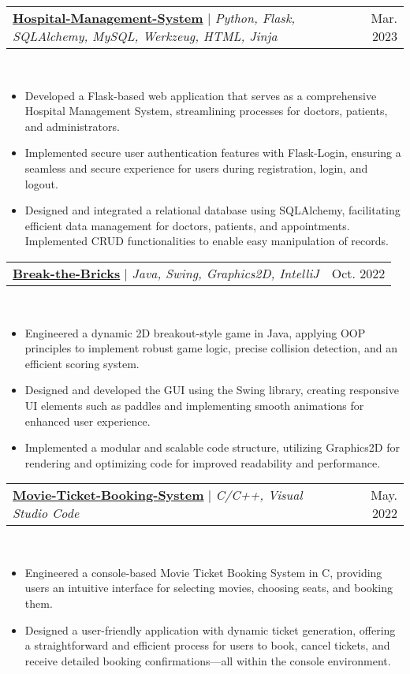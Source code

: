 \documentclass[letterpaper,11pt]{article}
\makeatletter
\newcommand{\resumeItem}[1]{
  \item\small{
    {#1 \vspace{-2pt}}
  }
}
\newcommand{\resumeProjectHeading}[2]{
    \item
    \begin{tabular*}{0.97\textwidth}{l@{\extracolsep{\fill}}r}
      \small#1 & #2 \\
    \end{tabular*}\vspace{-7pt}
}
\newcommand{\resumeItemListStart}{\begin{itemize}}
\newcommand{\resumeItemListEnd}{\end{itemize}\vspace{-5pt}}
\makeatother
\begin{document}
        \resumeProjectHeading
         {\href{https://github.com/Kathankathrotiya/Hospital-Management-System}{\faIcon{external-link-alt} \textbf{ Hospital-Management-System}} $|$ \footnotesize\emph{Python, Flask, SQLAlchemy, MySQL, Werkzeug, HTML, Jinja}}{Mar. 2023} \\
        \resumeItemListStart
            \resumeItem{Developed a Flask-based web application that serves as a comprehensive Hospital Management System, streamlining processes for doctors, patients, and administrators.}
            \resumeItem{Implemented secure user authentication features with Flask-Login, ensuring a seamless and secure experience for users during registration, login, and logout.}
            \resumeItem{Designed and integrated a relational database using SQLAlchemy, facilitating efficient data management for doctors, patients, and appointments. Implemented CRUD functionalities to enable easy manipulation of records.}
          \resumeItemListEnd
          
        \resumeProjectHeading
         {\href{https://github.com/Kathankathrotiya/Break-the-Bricks}{\faIcon{external-link-alt} \textbf{ Break-the-Bricks}} $|$ \footnotesize\emph{Java, Swing, Graphics2D, IntelliJ}}{Oct. 2022} \\
        \resumeItemListStart
            \resumeItem{Engineered a dynamic 2D breakout-style game in Java, applying OOP principles to implement robust game logic, precise collision detection, and an efficient scoring system.}
            \resumeItem{Designed and developed the GUI using the Swing library, creating responsive UI elements such as paddles and implementing smooth animations for enhanced user experience.}
            \resumeItem{Implemented a modular and scalable code structure, utilizing Graphics2D for rendering and optimizing code for improved readability and performance.}
          \resumeItemListEnd

        \resumeProjectHeading
        {\href{https://github.com/Kathankathrotiya/Movie-Ticket-Booking-System}{\faIcon{external-link-alt} \textbf{ Movie-Ticket-Booking-System}} $|$ \footnotesize\emph{C/C++, Visual Studio Code}}{May. 2022}\\
        \resumeItemListStart
            \resumeItem{Engineered a console-based Movie Ticket Booking System in C, providing users an intuitive interface for selecting movies, choosing seats, and booking them.}
            \resumeItem{Designed a user-friendly application with dynamic ticket generation, offering a straightforward and efficient process for users to book, cancel tickets, and receive detailed booking confirmations—all within the console environment.}
          \resumeItemListEnd
          
\end{document}
